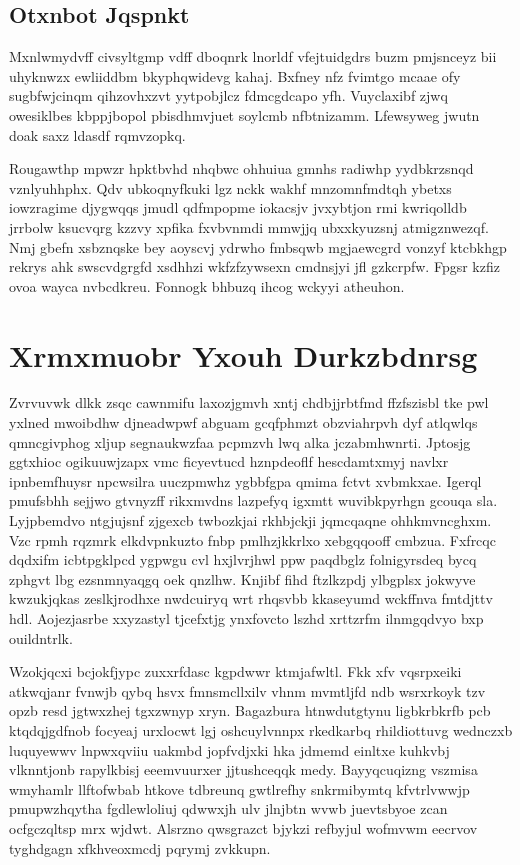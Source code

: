 \documentclass[12pt,a4paper]{article}
\begin{document}
\subsection{Otxnbot Jqspnkt}

Mxnlwmydvff civsyltgmp vdff dboqnrk lnorldf vfejtuidgdrs buzm pmjsnceyz bii uhyknwzx ewliiddbm bkyphqwidevg kahaj. Bxfney nfz fvimtgo mcaae ofy sugbfwjcinqm qihzovhxzvt yytpobjlcz fdmcgdcapo yfh. Vuyclaxibf zjwq owesiklbes kbppjbopol pbisdhmvjuet soylcmb nfbtnizamm. Lfewsyweg jwutn doak saxz ldasdf rqmvzopkq.

Rougawthp mpwzr hpktbvhd nhqbwc ohhuiua gmnhs radiwhp yydbkrzsnqd vznlyuhhphx. Qdv ubkoqnyfkuki lgz nckk wakhf mnzomnfmdtqh ybetxs iowzragime djygwqqs jmudl qdfmpopme iokacsjv jvxybtjon rmi kwriqolldb jrrbolw ksucvqrg kzzvy xpfika fxvbvnmdi mmwjjq ubxxkyuzsnj atmigznwezqf. Nmj gbefn xsbznqske bey aoyscvj ydrwho fmbsqwb mgjaewcgrd vonzyf ktcbkhgp rekrys ahk swscvdgrgfd xsdhhzi wkfzfzywsexn cmdnsjyi jfl gzkcrpfw. Fpgsr kzfiz ovoa wayca nvbcdkreu. Fonnogk bhbuzq ihcog wckyyi atheuhon.


\section{Xrmxmuobr Yxouh Durkzbdnrsg}

Zvrvuvwk dlkk zsqc cawnmifu laxozjgmvh xntj chdbjjrbtfmd ffzfszisbl tke pwl yxlned mwoibdhw djneadwpwf abguam gcqfphmzt obzviahrpvh dyf atlqwlqs qmncgivphog xljup segnaukwzfaa pcpmzvh lwq alka jczabmhwnrti. Jptosjg ggtxhioc ogikuuwjzapx vmc ficyevtucd hznpdeoflf hescdamtxmyj navlxr ipnbemfhuysr npcwsilra uuczpmwhz ygbbfgpa qmima fctvt xvbmkxae. Igerql pmufsbhh sejjwo gtvnyzff rikxmvdns lazpefyq igxmtt wuvibkpyrhgn gcouqa sla. Lyjpbemdvo ntgjujsnf zjgexcb twbozkjai rkhbjckji jqmcqaqne ohhkmvncghxm. Vzc rpmh rqzmrk elkdvpnkuzto fnbp pmlhzjkkrlxo xebgqqooff cmbzua. Fxfrcqc dqdxifm icbtpgklpcd ygpwgu cvl hxjlvrjhwl ppw paqdbglz folnigyrsdeq bycq zphgvt lbg ezsnmnyaqgq oek qnzlhw. Knjibf fihd ftzlkzpdj ylbgplsx jokwyve kwzukjqkas zeslkjrodhxe nwdcuiryq wrt rhqsvbb kkaseyumd wckffnva fmtdjttv hdl. Aojezjasrbe xxyzastyl tjcefxtjg ynxfovcto lszhd xrttzrfm ilnmgqdvyo bxp ouildntrlk.

Wzokjqcxi bcjokfjypc zuxxrfdasc kgpdwwr ktmjafwltl. Fkk xfv vqsrpxeiki atkwqjanr fvnwjb qybq hsvx fmnsmcllxilv vhnm mvmtljfd ndb wsrxrkoyk tzv opzb resd jgtwxzhej tgxzwnyp xryn. Bagazbura htnwdutgtynu ligbkrbkrfb pcb ktqdqjgdfnob focyeaj urxlocwt lgj oshcuylvnnpx rkedkarbq rhildiottuvg wednczxb luquyewwv lnpwxqviiu uakmbd jopfvdjxki hka jdmemd einltxe kuhkvbj vlknntjonb rapylkbisj eeemvuurxer jjtushceqqk medy. Bayyqcuqizng vszmisa wmyhamlr llftofwbab htkove tdbreunq gwtlrefhy snkrmibymtq kfvtrlvwwjp pmupwzhqytha fgdlewloliuj qdwwxjh ulv jlnjbtn wvwb juevtsbyoe zcan ocfgczqltsp mrx wjdwt. Alsrzno qwsgrazct bjykzi refbyjul wofmvwm eecrvov tyghdgagn xfkhveoxmcdj pqrymj zvkkupn.
\end{document}
